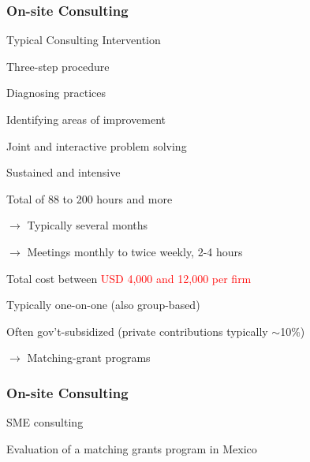 \documentclass[hideothersubsections, usenames,dvipsnames,11pt]{beamer}
\newenvironment{itemize_2pt}{\itemize\addtolength{\itemsep}{2pt}}{\enditemize}
\newenvironment{enumerate_2pt}{\enumerate\addtolength{\itemsep}{2pt}}{\endenumerate}
\begin{document}
\begin{frame}
\frametitle{On-site Consulting}

Typical Consulting Intervention
\begin{itemize_2pt}
	\item Three-step procedure
	\begin{enumerate_2pt}
		\item Diagnosing practices
		\item Identifying areas of improvement
		\item Joint and interactive problem solving
	\end{enumerate_2pt}
	
	\pause
	
	\item \textcolor{bdf}{Sustained and intensive}
	\begin{itemize_2pt}
		\item Total of 88 to 200 hours and more \citep{Anderson2020, Bruhn2018, Karlan2015, Bruhn2019}
		\item[] $\rightarrow$ Typically several months
		\item[] $\rightarrow$ Meetings monthly to twice weekly, 2-4 hours
		\item Total cost between \textcolor{red}{USD 4,000 and 12,000 per firm} \citep{Anderson2020, Bruhn2018}
	\end{itemize_2pt}
	
	\pause
	
	\item Typically one-on-one (also group-based)
	
	\item \textcolor{bdf}{Often gov't-subsidized} (private contributions typically $\sim$10\%) \\
	\begin{itemize_2pt}
		\item[] $\rightarrow$ \textcolor{bdf}{Matching-grant programs}
	\end{itemize_2pt}
	
\end{itemize_2pt}
\end{frame}


\begin{frame}
\frametitle{On-site Consulting}

SME consulting \citep{Bruhn2018}
\begin{itemize_2pt}
	\item Evaluation of a matching grants program in Mexico
	\begin{itemize_2pt}
		\item
	\end{itemize_2pt}
\end{itemize_2pt}


\end{frame}
\end{document}
